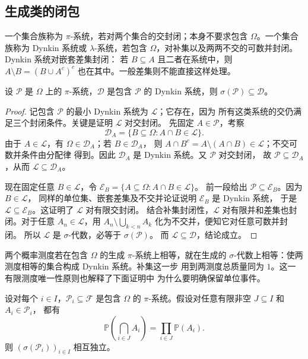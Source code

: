 \subsection{生成类的闭包}

一个集合族称为 $\pi$-系统，若对两个集合的交封闭；本身不要求包含
$\Omega$。一个集合族称为 Dynkin 系统或 $\lambda$-系统，若包含
$\Omega$，对补集以及两两不交的可数并封闭。Dynkin 系统对嵌套差集封闭：
若 $B\subseteq A$ 且二者在系统中，则
$A\setminus B=(B\cup A^c)^c$ 也在其中。一般差集则不能直接这样处理。

\begin{theorem}[$\pi$--$\lambda$ 方法]
\label{thm:independence-pi-lambda}
设 $\mathcal P$ 是 $\Omega$ 上的 $\pi$-系统，$\mathcal D$ 是包含
$\mathcal P$ 的 Dynkin 系统，则 $\sigma(\mathcal P)\subseteq\mathcal D$。
\end{theorem}

\begin{proof}
记包含 $\mathcal P$ 的最小 Dynkin 系统为 $\mathcal L$；它存在，因为
所有这类系统的交仍满足三个封闭条件。关键是证明 $\mathcal L$ 对交封闭。
先固定 $A\in\mathcal P$，考察
\[
 \mathcal D_A=\{B\subseteq\Omega:A\cap B\in\mathcal L\}.
\]
由于 $A\in\mathcal L$，有 $\Omega\in\mathcal D_A$；若 $B\in\mathcal D_A$，
则 $A\cap B^c=A\setminus(A\cap B)\in\mathcal L$；不交可数并条件由分配律
得到。因此 $\mathcal D_A$ 是 Dynkin 系统。又 $\mathcal P$ 对交封闭，
故 $\mathcal P\subseteq\mathcal D_A$，从而 $\mathcal L\subseteq\mathcal D_A$。

现在固定任意 $B\in\mathcal L$，令
$\mathcal E_B=\{A\subseteq\Omega:A\cap B\in\mathcal L\}$。
前一段给出 $\mathcal P\subseteq\mathcal E_B$。因为 $B\in\mathcal L$，
同样的单位集、嵌套差集及不交并论证说明 $\mathcal E_B$ 是 Dynkin 系统，
于是 $\mathcal L\subseteq\mathcal E_B$。这证明了 $\mathcal L$ 对有限交封闭。
结合补集封闭性，$\mathcal L$ 对有限并和差集也封闭。对于任意
$A_n\in\mathcal L$，用
$A_n\setminus\bigcup_{k<n}A_k$ 化为不交并，便知它对任意可数并封闭。
所以 $\mathcal L$ 是 $\sigma$-代数，必等于 $\sigma(\mathcal P)$。
而 $\mathcal L\subseteq\mathcal D$，结论成立。
\end{proof}

两个概率测度若在包含 $\Omega$ 的生成 $\pi$-系统上相等，就在生成的
$\sigma$-代数上相等：使两测度相等的集合构成 Dynkin 系统。补集这一步
用到两测度总质量同为 $1$。这一有限测度唯一性原则也解释了下面证明中
为什么要明确保留单位事件。

\begin{theorem}[独立性的生成类判别]
\label{thm:independence-generating-classes}
设对每个 $i\in I$，$\mathcal P_i\subseteq\mathcal F$ 是包含 $\Omega$ 的
$\pi$-系统。假设对任意有限非空 $J\subseteq I$ 和 $A_i\in\mathcal P_i$，
都有
\[
 \mathbb P\left(\bigcap_{i\in J}A_i\right)
 =\prod_{i\in J}\mathbb P(A_i).
\]
则 $(\sigma(\mathcal P_i))_{i\in I}$ 相互独立。
\end{theorem}

